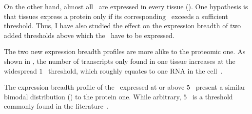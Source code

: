 On the other hand,
almost all \mRNAs\ are expressed in every tissue ().
One hypothesis is that tissues express a protein only
if its corresponding \mRNA\ exceeds a sufficient threshold.
Thus, I have also studied the effect on the expression breadth
of two added thresholds above which the \mRNAs\ have to be expressed.

The two new expression breadth profiles are more alike
to the proteomic one.
As shown in ,
the number of transcripts only found in one tissue increases
at the widespread $1$ \FPKM\ threshold,
which roughly equates to one \gls{RNA} in the cell~.

The expression breadth profile of the \mRNAs\ expressed at or above $5$ \FPKM\
present a similar bimodal distribution () to the protein one.
While arbitrary, $5$ \FPKM\ is a threshold commonly found
in the literature~.

